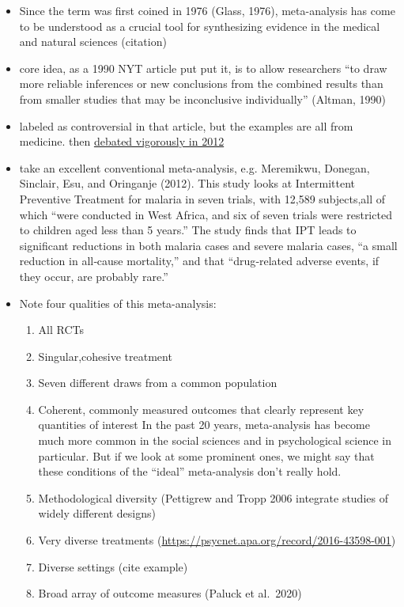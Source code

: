 \documentclass[
  man]{apa6}
\providecommand{\tightlist}{%
  \setlength{\itemsep}{0pt}\setlength{\parskip}{0pt}}
\begin{document}
\begin{itemize}
\item
  Since the term was first coined in 1976 (Glass, 1976), meta-analysis has come to be understood as a crucial tool for synthesizing evidence in the medical and natural sciences (citation)
\item
  core idea, as a 1990 NYT article put put it, is to allow researchers ``to draw more reliable inferences or new conclusions from the combined results than from smaller studies that may be inconclusive individually'' (Altman, 1990)
\item
  labeled as controversial in that article, but the examples are all from medicine. then \href{https://www.nytimes.com/2012/10/16/science/stanford-organic-food-study-and-vagaries-of-meta-analyses.html}{debated vigorously in 2012}
\item
  take an excellent conventional meta-analysis, e.g. Meremikwu, Donegan, Sinclair, Esu, and Oringanje (2012). This study looks at Intermittent Preventive Treatment for malaria in seven trials, with 12,589 subjects,all of which ``were conducted in West Africa, and six of seven trials were restricted to children aged less than 5 years.'' The study finds that IPT leads to significant reductions in both malaria cases and severe malaria cases, ``a small reduction in all‐cause mortality,'' and that ``drug‐related adverse events, if they occur, are probably rare.''
\item
  Note four qualities of this meta-analysis:

  \begin{enumerate}
  \def\labelenumi{\arabic{enumi}.}
  \tightlist
  \item
    All RCTs
  \item
    Singular,cohesive treatment
  \item
    Seven different draws from a common population
  \item
    Coherent, commonly measured outcomes that clearly represent key quantities of interest
    In the past 20 years, meta-analysis has become much more common in the social sciences and in psychological science in particular. But if we look at some prominent ones, we might say that these conditions of the ``ideal'' meta-analysis don't really hold.
  \item
    Methodological diversity (Pettigrew and Tropp 2006 integrate studies of widely different designs)
  \item
    Very diverse treatments (\url{https://psycnet.apa.org/record/2016-43598-001})
  \item
    Diverse settings (cite example)
  \item
    Broad array of outcome measures (Paluck et al.~2020)
  \end{enumerate}
\end{itemize}
\end{document}
